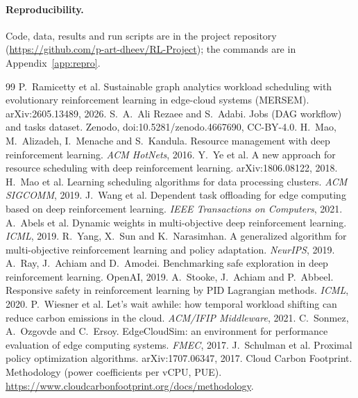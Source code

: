 \documentclass[11pt,a4paper]{article}
\begin{document}
\paragraph{Reproducibility.} Code, data, results and run scripts are in the project repository (\url{https://github.com/p-art-dheev/RL-Project}); the commands are in Appendix~\ref{app:repro}.

\begin{thebibliography}{99}\small
{} P.~Ramicetty et al. Sustainable graph analytics workload scheduling with evolutionary reinforcement learning in edge-cloud systems (MERSEM). arXiv:2605.13489, 2026.
 S.~A.~Ali Rezaee and S.~Adabi. Jobs (DAG workflow) and tasks dataset. Zenodo, doi:10.5281/zenodo.4667690, CC-BY-4.0.
 H.~Mao, M.~Alizadeh, I.~Menache and S.~Kandula. Resource management with deep reinforcement learning. \emph{ACM HotNets}, 2016.
 Y.~Ye et al. A new approach for resource scheduling with deep reinforcement learning. arXiv:1806.08122, 2018.
 H.~Mao et al. Learning scheduling algorithms for data processing clusters. \emph{ACM SIGCOMM}, 2019.
 J.~Wang et al. Dependent task offloading for edge computing based on deep reinforcement learning. \emph{IEEE Transactions on Computers}, 2021.
 A.~Abels et al. Dynamic weights in multi-objective deep reinforcement learning. \emph{ICML}, 2019.
 R.~Yang, X.~Sun and K.~Narasimhan. A generalized algorithm for multi-objective reinforcement learning and policy adaptation. \emph{NeurIPS}, 2019.
 A.~Ray, J.~Achiam and D.~Amodei. Benchmarking safe exploration in deep reinforcement learning. OpenAI, 2019.
 A.~Stooke, J.~Achiam and P.~Abbeel. Responsive safety in reinforcement learning by PID Lagrangian methods. \emph{ICML}, 2020.
 P.~Wiesner et al. Let's wait awhile: how temporal workload shifting can reduce carbon emissions in the cloud. \emph{ACM/IFIP Middleware}, 2021.
 C.~Sonmez, A.~Ozgovde and C.~Ersoy. EdgeCloudSim: an environment for performance evaluation of edge computing systems. \emph{FMEC}, 2017.
 J.~Schulman et al. Proximal policy optimization algorithms. arXiv:1707.06347, 2017.
 Cloud Carbon Footprint. Methodology (power coefficients per vCPU, PUE). \url{https://www.cloudcarbonfootprint.org/docs/methodology}.
\end{thebibliography}
\end{document}
